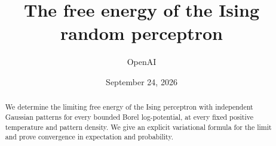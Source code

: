 \documentclass[11pt]{article}
\title{The free energy of the Ising random perceptron}
\author{OpenAI}
\date{September 24, 2026}
\begin{document}
\maketitle
\begin{abstract}
We determine the limiting free energy of the Ising perceptron with independent
Gaussian patterns for every bounded Borel log-potential, at every fixed positive
temperature and pattern density. We give an explicit variational formula for
the limit and prove convergence in expectation and probability.
\end{abstract}
\tableofcontents









\setlength{\bibsep}{6pt}

\end{document}
